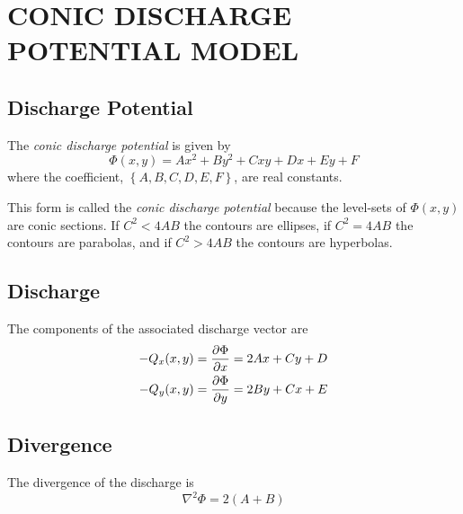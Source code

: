 \documentclass[12pt]{report}
\providecommand{\pderiv}[2]{\frac{\mathinner{\partial#1}}{\mathinner{\partial#2}}}
\begin{document}
\chapter{CONIC DISCHARGE POTENTIAL MODEL}
\section{Discharge Potential}
The {\em conic discharge potential} is given by
%
\begin{equation} \label{4.1.1}
\boxed{
    \Phi(x,y) = Ax^2 + By^2 + Cxy + Dx + Ey + F
}
\end{equation}
%
where the coefficient, $\left\{ A, B, C, D, E, F \right\}$, are real constants.

This form is called the {\em conic discharge potential} because the level-sets of $\Phi(x,y)$ are conic sections.  If $C^2 < 4AB$ the contours are ellipses, if $C^2 = 4AB$ the contours are parabolas, and if $C^2 > 4AB$ the contours are hyperbolas.


\section{Discharge}
The components of the associated discharge vector are
%
\begin{align}
    -Q_x(x,y) &= \pderiv{\Phi}{x} = 2Ax + Cy + D \label{4.1.2}\\
    -Q_y(x,y) &= \pderiv{\Phi}{y} = 2By + Cx + E \label{4.1.3}
\end{align}


\section{Divergence}
The divergence of the discharge is
%
\begin{equation}\label{4.1.4}
    \nabla^2 \Phi = 2(A+B)
\end{equation}
\end{document}
